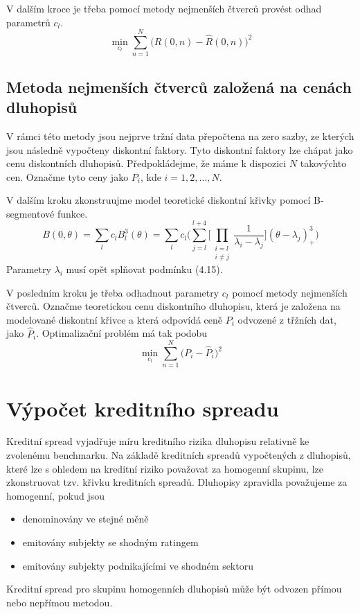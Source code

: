 \documentclass[a4paper]{book}
\begin{document}
V dalším kroce je třeba pomocí metody nejmenších čtverců provést odhad parametrů $c_l$.
\begin{equation*}
\underset{c_l}{\min} \sum_{n=1}^{N}\Big(R(0,n) - \hat{R}(0,n) \Big)^2
\end{equation*}

\subsection{Metoda nejmenších čtverců založená na cenách dluhopisů}

V rámci této metody jsou nejprve tržní data přepočtena na zero sazby, ze kterých jsou následně vypočteny diskontní faktory. Tyto diskontní faktory lze chápat jako cenu diskontních dluhopisů. Předpokládejme, že máme k dispozici $N$ takovýchto cen. Označme tyto ceny jako $P_i$, kde $i = 1,2, \dots, N$.

V dalším kroku zkonstruujme model teoretické diskontní křivky pomocí B-segmentové funkce.
\begin{equation*}
B(0, \theta) = \sum_l c_l B_l^3(\theta) = \sum_l c_l \Bigg( \sum_{j = l}^{l+4}\Big[ \prod_{\substack{i=l \\ i \neq j}}\frac{1}{\lambda_i - \lambda_j}\Big](\theta - \lambda_j)_{+}^3 \Bigg)
\end{equation*}
Parametry $\lambda_i$ musí opět splňovat podmínku (4.15).

V posledním kroku je třeba odhadnout parametry $c_l$ pomocí metody nejmenších čtverců. Označme teoretickou cenu diskontního dluhopisu, která je založena na modelované diskontní křivce a která odpovídá ceně $P_i$ odvozené z třžních dat, jako $\hat{P}_i$. Optimalizační problém má tak podobu 
\begin{equation*}
\underset{c_l}{\min}\sum_{n=1}^N \Big(P_i - \hat{P}_i \Big)^2
\end{equation*}

\section{Výpočet kreditního spreadu}

Kreditní spread vyjadřuje míru kreditního rizika dluhopisu relativně ke zvolenému benchmarku. Na základě kreditních spreadů vypočtených z dluhopisů, které lze s ohledem na kreditní riziko považovat za homogenní skupinu, lze zkonstruovat tzv. křivku kreditních spreadů. Dluhopisy zpravidla považujeme za homogenní, pokud jsou
\begin{itemize}
\item denominovány ve stejné měně
\item emitovány subjekty se shodným ratingem
\item emitovány subjekty podnikajícími ve shodném sektoru
\end{itemize}
Kreditní spread pro skupinu homogenních dluhopisů může být odvozen přímou nebo nepřímou metodou.
\end{document}
